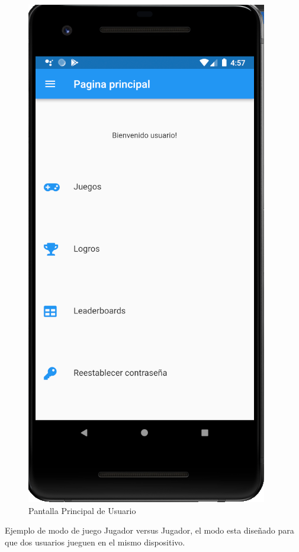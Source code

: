 \documentclass{article}
\begin{document}
\begin{figure}[H]
    \centering
    \includegraphics[scale=0.8]{imgs/Imp/MainUsuario}
    \caption{Pantalla Principal de Usuario}
\end{figure}
Ejemplo de modo de juego Jugador versus Jugador, el modo esta diseñado para que dos usuarios jueguen en el mismo dispositivo.
\end{document}
